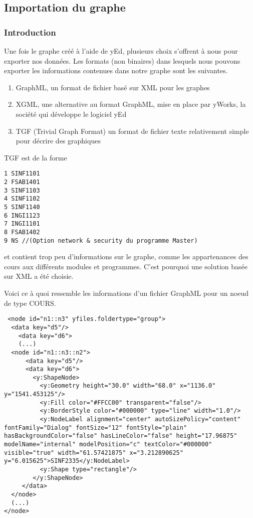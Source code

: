 \subsection{Importation du graphe}
\subsubsection{Introduction}
Une fois le graphe créé à l'aide de yEd, plusieurs choix s'offrent à nous pour exporter nos données. Les formats (non binaires) dans lesquels nous pouvons exporter les informations contenues dans notre graphe sont les suivantes. 
\begin{enumerate}
\item GraphML, un format de fichier basé sur XML pour les graphes
\item XGML, une alternative au format GraphML, mise en place par yWorks, la société qui développe le logiciel yEd
\item TGF (Trivial Graph Format) un format de fichier texte relativement simple pour décrire des graphiques
\end{enumerate}

TGF est de la forme

\begin{lstlisting}
1 SINF1101
2 FSAB1401
3 SINF1103
4 SINF1102
5 SINF1140
6 INGI1123
7 INGI1101
8 FSAB1402
9 NS //(Option network & security du programme Master)
\end{lstlisting}

et contient trop peu d'informations sur le graphe, comme les appartenances des cours aux différents modules et programmes. C'est pourquoi une solution basée sur XML a été choisie.

Voici ce à quoi ressemble les informations d'un fichier GraphML pour un noeud de type COURS.

\begin{lstlisting}
 <node id="n1::n3" yfiles.foldertype="group">
  <data key="d5"/>
    <data key="d6">
    (...)
  <node id="n1::n3::n2">
      <data key="d5"/>
      <data key="d6">
        <y:ShapeNode>
          <y:Geometry height="30.0" width="68.0" x="1136.0" y="1541.453125"/>
          <y:Fill color="#FFCC00" transparent="false"/>
          <y:BorderStyle color="#000000" type="line" width="1.0"/>
          <y:NodeLabel alignment="center" autoSizePolicy="content" fontFamily="Dialog" fontSize="12" fontStyle="plain" hasBackgroundColor="false" hasLineColor="false" height="17.96875" modelName="internal" modelPosition="c" textColor="#000000" visible="true" width="61.57421875" x="3.212890625" y="6.015625">SINF2335</y:NodeLabel>
          <y:Shape type="rectangle"/>
        </y:ShapeNode>
     </data>
  </node>
  (...)
</node>
\end{lstlisting}

